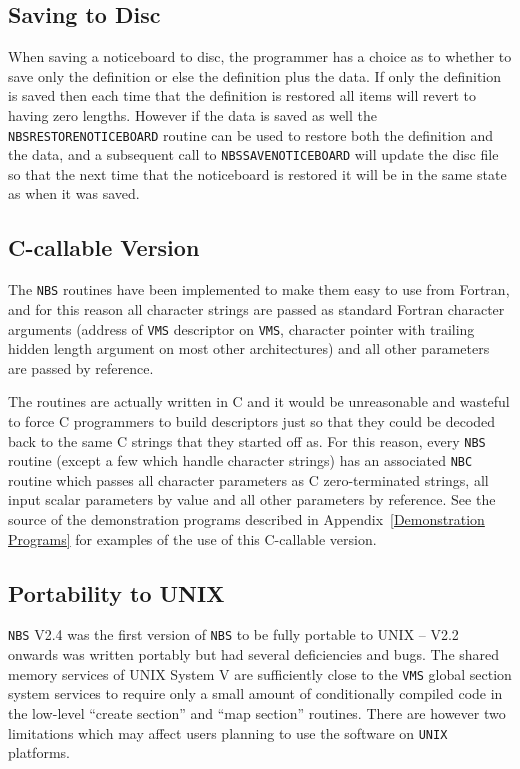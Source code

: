\documentclass[twoside,11pt]{article}
\renewcommand{\_}{\texttt{\symbol{95}}}
\begin{document}
      \subsection {Saving to Disc} When saving a noticeboard to disc, the
      programmer has a choice as to whether to save only the definition
      or else the definition plus the data. If only the definition is saved
      then each time that the definition is restored
      all items will revert to having zero lengths. However if the data
      is saved as well the {\tt NBS\_RESTORE\_NOTICEBOARD} routine can be used
      to restore both the definition and the data, and a subsequent call
      to {\tt NBS\_SAVE\_NOTICEBOARD} will update the disc file so that
      the next
      time that the noticeboard is restored it will be in the same state
      as when it was saved.

      \subsection {C-callable Version} The {\tt NBS} routines have been %
      implemented to make them easy to use from Fortran, and for this 
      reason all character strings are passed as standard Fortran character
      arguments (address of {\tt VMS} descriptor on {\tt VMS}, character 
      pointer with trailing hidden length argument on most other architectures)
      and all other parameters are passed by reference. 

      The routines are actually written in C and it
      would be unreasonable and wasteful to force C programmers to build
      descriptors just so that they could be decoded back to the same C strings
      that they started off as. For this reason, every {\tt NBS} routine %
(except a few which handle character strings) has an
      associated {\tt NBC} routine which passes all character parameters %
as C
      zero-terminated strings, all input scalar parameters by value and all
      other parameters by reference. See the source of the demonstration
      programs described in Appendix~\ref {Demonstration Programs} for examples
      of the use of this C-callable version.

      \subsection {Portability to UNIX} 
      {\tt NBS} V2.4 was the first version of {\tt NBS} to be fully portable
      to UNIX -- V2.2 onwards was written portably but had several 
      deficiencies and bugs. The shared memory services of UNIX System V
      are sufficiently close to the {\tt VMS} global section system 
      services to require only a small amount of conditionally compiled code
      in the low-level ``create section'' and ``map section'' routines. 
      There are however two limitations which may affect users planning
      to use the software on {\tt UNIX} platforms. 
\end{document}
